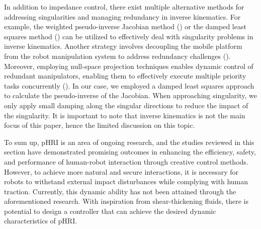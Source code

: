 In addition to impedance control, there exist multiple alternative methods for addressing singularities and managing redundancy in inverse kinematics. For example, the weighted pseudo-inverse Jacobian method (\cite{mussa1991integrable}) or the damped least squares method (\cite{zhan2021adaptive}) can be utilized to effectively deal with singularity problems in inverse kinematics. Another strategy involves decoupling the mobile platform from the robot manipulation system to address redundancy challenges (\cite{chung1998interaction}). Moreover, employing null-space projection techniques enables dynamic control of redundant manipulators, enabling them to effectively execute multiple priority tasks concurrently (\cite{ott2015prioritized}). In our case, we employed a damped least squares approach to calculate the pseudo-inverse of the Jacobian. When approaching singularity, we only apply small damping along the singular directions to reduce the impact of the singularity. It is important to note that inverse kinematics is not the main focus of this paper, hence the limited discussion on this topic.

To sum up, pHRI is an area of ongoing research, and the studies reviewed in this section have demonstrated promising outcomes in enhancing the efficiency, safety, and performance of human-robot interaction through creative control methods. However, to achieve more natural and secure interactions, it is necessary for robots to withstand external impact disturbances while complying with human traction. Currently, this dynamic ability has not been attained through the aforementioned research. With inspiration from shear-thickening fluids, there is potential to design a controller that can achieve the desired dynamic characteristics of pHRI.



